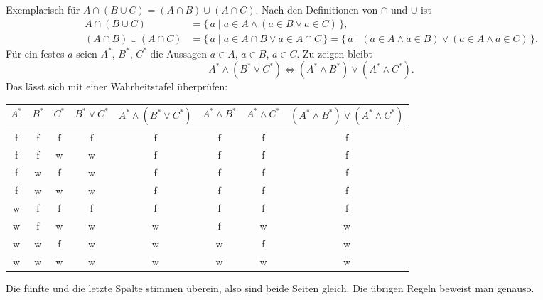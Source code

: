 \documentclass[a4paper]{article}
\makeatletter
\theoremstyle{kurzskript}
\renewenvironment{proof}[1][\proofname]{\par\pushQED{\qed}%
  \normalfont\topsep\medskipamount\relax
  \trivlist\item[\hskip\labelsep\bfseries #1\@addpunct{.}]\ignorespaces}%
  {\popQED\endtrivlist\@endpefalse}
\renewcommand{\proofname}{Beweis}
\newcommand{\w}{\textsf{w}}   %
\newcommand{\f}{\textsf{f}}   %
\makeatother
\begin{document}
\begin{proof}
Exemplarisch für $A \cap (B \cup C) = (A \cap B) \cup (A \cap C)$. Nach den Definitionen von $\cap$ und $\cup$ ist
\begin{align*}
  A \cap (B \cup C) &= \{\, a \mid a \in A \land (a \in B \lor a \in C) \,\},\\
  (A \cap B) \cup (A \cap C) &= \{\, a \mid a \in A \cap B \lor a \in A \cap C \,\} = \{\, a \mid (a \in A \land a \in B) \lor (a \in A \land a \in C) \,\}.
\end{align*}
Für ein festes $a$ seien $A^*$, $B^*$, $C^*$ die Aussagen \glqq$a \in A$\grqq, \glqq$a \in B$\grqq, \glqq$a \in C$\grqq. Zu zeigen bleibt
\[
  A^* \land (B^* \lor C^*) \iff (A^* \land B^*) \lor (A^* \land C^*).
\]
Das lässt sich mit einer Wahrheitstafel überprüfen:
\begin{center}
\small
\begin{tabular}{ccc|c|c|c|c|c}
$A^*$ & $B^*$ & $C^*$ & $B^* \lor C^*$ & $A^* \land (B^* \lor C^*)$ & $A^* \land B^*$ & $A^* \land C^*$ & $(A^* \land B^*) \lor (A^* \land C^*)$\\\hline
\f & \f & \f & \f & \f & \f & \f & \f\\
\f & \f & \w & \w & \f & \f & \f & \f\\
\f & \w & \f & \w & \f & \f & \f & \f\\
\f & \w & \w & \w & \f & \f & \f & \f\\
\w & \f & \f & \f & \f & \f & \f & \f\\
\w & \f & \w & \w & \w & \f & \w & \w\\
\w & \w & \f & \w & \w & \w & \f & \w\\
\w & \w & \w & \w & \w & \w & \w & \w
\end{tabular}
\end{center}
Die fünfte und die letzte Spalte stimmen überein, also sind beide Seiten gleich. Die übrigen Regeln beweist man genauso.
\end{proof}
\end{document}
